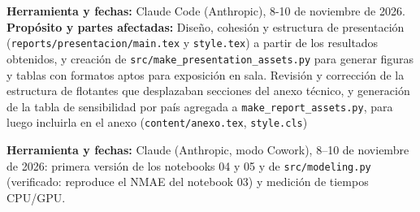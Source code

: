 \textbf{Herramienta y fechas:} Claude Code (Anthropic), 8-10 de noviembre de 2026. \textbf{Propósito y partes afectadas:} Diseño, cohesión y estructura de presentación (\texttt{reports/presentacion/main.tex} y \texttt{style.tex}) a partir de los resultados obtenidos, y creación de \texttt{src/make\_presentation\_assets.py} para generar figuras y tablas con formatos aptos para exposición en sala. Revisión y corrección de la estructura de flotantes que desplazaban secciones del anexo técnico, y generación de la tabla de sensibilidad por país agregada a \texttt{make\_report\_assets.py}, para luego incluirla en el anexo (\texttt{content/anexo.tex}, \texttt{style.cls})

\textbf{Herramienta y fechas:} Claude (Anthropic, modo Cowork), 8--10 de noviembre de 2026: primera versión de los notebooks 04 y 05 y de \texttt{src/modeling.py} (verificado: reproduce el NMAE del notebook 03) y medición de tiempos CPU/GPU.
